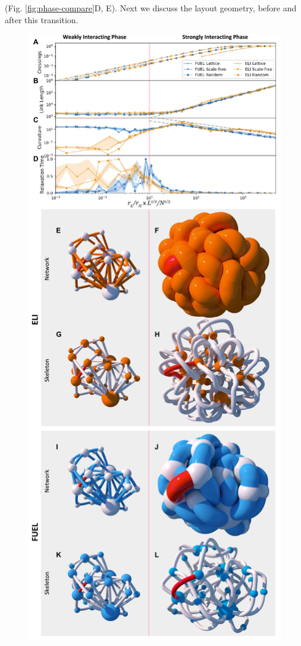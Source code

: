 \documentclass[nofootinbib,preprint,floatfix,titlepage,superscriptaddress]{revtex4} %
\begin{document}
(Fig. \ref{fig:phase-compare}D, E). 
Next we discuss the layout geometry, before and after this transition.%
\begin{figure}
\centering
\includegraphics[height=\textheight]{fig-09-19/3d-phase-compare-110317-1.pdf}

\end{figure}
\end{document}
